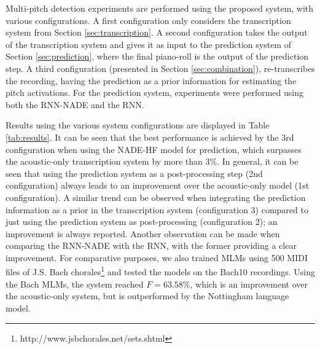 \begin{table}[t]
 \begin{center}
\end{center}
 \caption{Validation results for MLMs}
 \label{tab:prediction}
\end{table}


Multi-pitch detection experiments are performed using the proposed system, with various configurations. A first configuration only considers the transcription system from Section \ref{sec:transcription}. A second configuration takes the output of the transcription system and gives it as input to the prediction system of Section \ref{sec:prediction}, where the final piano-roll is the output of the prediction step. A third configuration (presented in Section \ref{sec:combination}), re-transcribes the recording, having the prediction as a prior information for estimating the pitch activations. For the prediction system, experiments were performed using both the RNN-NADE and the RNN.

Results using the various system configurations are displayed in Table \ref{tab:results}. It can be seen that the best performance is achieved by the 3rd configuration when using the NADE-HF model for prediction, which surpasses the acoustic-only transcription system by more than 3\%. In general, it can be seen that using the prediction system as a post-processing step (2nd configuration) always leads to an improvement over the acoustic-only model (1st configuration). A similar trend can be observed when integrating the prediction information as a prior in the transcription system (configuration 3) compared to just using the prediction system as post-processing (configuration 2); an improvement is always reported. Another observation can be made when comparing the RNN-NADE with the RNN, with the former providing a clear improvement. For comparative purposes, we also trained MLMs using 500 MIDI files of J.S. Bach chorales\footnote{http://www.jsbchorales.net/sets.shtml} and tested the models on the Bach10 recordings. Using the Bach MLMs, the system reached $F =  63.58\%$, which is an improvement over the acoustic-only system, but is outperformed by the Nottingham language model. 

